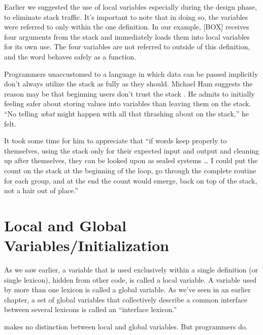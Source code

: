 
Earlier we suggested the use of local variables especially during the
design phase, to eliminate stack traffic. It's important to note that in
doing so, the variables were referred to only within the one definition. In
our example, [BOX] receives four arguments from the stack and immediately
loads them into local variables for its own use. The four variables are not
referred to outside of this definition, and the word behaves safely as a
function.

Programmers unaccustomed to a language in which data can be
passed implicitly don't always utilize the stack as fully as they should.
Michael Ham suggests the reason may be that beginning \Forth{} users
don't trust the stack \cite{ham83}. He admits to initially feeling safer about storing
values into variables than leaving them on the stack. ``No telling \emph{what}
might happen with all that thrashing about on the stack,'' he felt.

It took some time for him to appreciate that ``if words keep properly
to themselves, using the stack only for their expected input and output
and cleaning up after themselves, they can be looked upon as sealed
systems \dots{} I could put the count on the stack at the beginning of the
loop, go through the complete routine for each group, and at the end the
count would emerge, back on top of the stack, not a hair out of place.''

\section{Local and Global Variables/Initialization}

As we saw earlier, a variable that is used exclusively within a single
definition (or single lexicon), hidden from other code, is called a local
variable. A variable used by more than one lexicon is called a global
variable. As we've seen in an earlier chapter, a set of global variables that
collectively describe a common interface between several lexicons is
called an ``interface lexicon.''

\Forth{} makes no distinction between local and global variables.
But \Forth{} programmers do.

